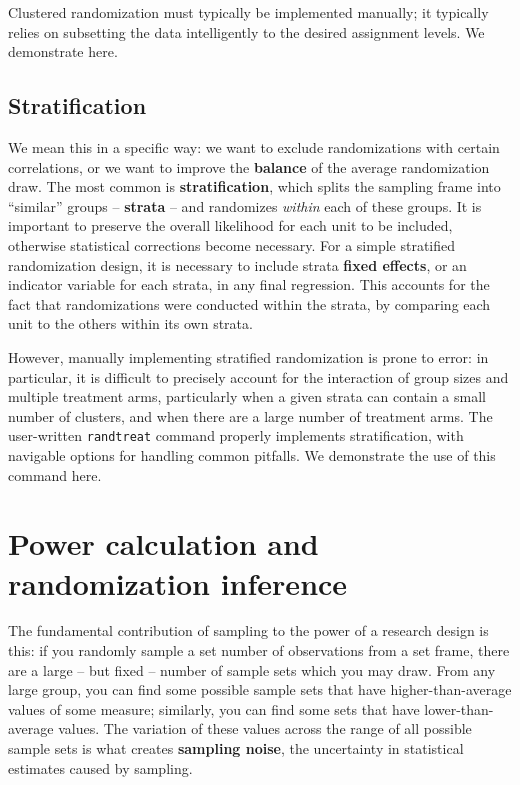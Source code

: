 Clustered randomization must typically be implemented manually;
it typically relies on subsetting the data intelligently
to the desired assignment levels.
We demonstrate here.

\subsection{Stratification}


We mean this in a specific way: we want to exclude
randomizations with certain correlations,
or we want to improve the \textbf{balance}
of the average randomization draw.\cite{bruhn2009pursuit}
The most common is \textbf{stratification},
which splits the sampling frame into ``similar'' groups -- \textbf{strata} --
and randomizes \textit{within} each of these groups.
It is important to preserve the overall likelihood for each unit to be included,
otherwise statistical corrections become necessary.
For a simple stratified randomization design,
it is necessary to include strata \textbf{fixed effects},
or an indicator variable for each strata, in any final regression.
This accounts for the fact that randomizations were conducted within the strata,
by comparing each unit to the others within its own strata.

However, manually implementing stratified randomization
is prone to error: in particular, it is difficult to precisely account
for the interaction of group sizes and multiple treatment arms,
particularly when a given strata can contain a small number of clusters,
and when there are a large number of treatment arms.\cite{carril2017dealing}
The user-written \texttt{randtreat} command
properly implements stratification,
with navigable options for handling common pitfalls.
We demonstrate the use of this command here.


\section{Power calculation and randomization inference}

The fundamental contribution of sampling to the power of a research design is this:
if you randomly sample a set number of observations from a set frame,
there are a large -- but fixed -- number of sample sets which you may draw.
From any large group, you can find some possible sample sets
that have higher-than-average values of some measure;
similarly, you can find some sets that have lower-than-average values.
The variation of these values across the range of all possible sample sets is what creates
\textbf{sampling noise}, the uncertainty in statistical estimates caused by sampling.

